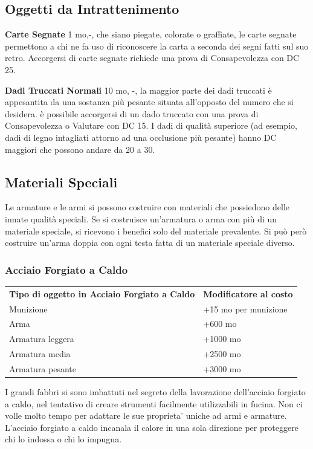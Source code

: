 \documentclass[a4paper,11pt,twoside,openany]{book}
\begin{document}
{\subsection{Oggetti da Intrattenimento}

\label{oggetti-da-intrattenimento}

\textbf{Carte Segnate} 1 mo,-, che siano piegate, colorate o graffiate, le carte segnate permettono a chi ne fa uso di riconoscere la carta a seconda dei segni fatti sul suo retro. Accorgersi di carte segnate richiede una prova di Consapevolezza con DC 25.

\textbf{Dadi Truccati Normali} 10 mo, -, la maggior parte dei dadi truccati è appesantita da una sostanza più pesante situata all'opposto del numero che si desidera. è possibile accorgersi di un dado truccato con una prova di Consapevolezza o Valutare con DC 15. I dadi di qualità superiore (ad esempio, dadi di legno intagliati attorno ad una occlusione più pesante) hanno DC maggiori che possono andare da 20 a 30.

\pagebreak

\subsection{Materiali Speciali}

Le armature e le armi si possono costruire con materiali che possiedono delle innate qualità speciali. Se si costruisce un'armatura o arma con più di un materiale speciale, si ricevono i benefici solo del materiale prevalente. Si può però costruire un'arma doppia con ogni testa fatta di un materiale speciale diverso.

\subsubsection{Acciaio Forgiato a Caldo}

\label{acciaio-forgiato-a-caldo}

\begin{tabular}{ll}
\toprule
\textbf{Tipo di oggetto in Acciaio Forgiato a Caldo} & \textbf{Modificatore al costo}\tabularnewline
Munizione & +15 mo per munizione\tabularnewline
Arma & +600 mo\tabularnewline
Armatura leggera & +1000 mo\tabularnewline
Armatura media & +2500 mo\tabularnewline
Armatura pesante & +3000 mo\tabularnewline
\end{tabular}

I grandi fabbri si sono imbattuti nel segreto della lavorazione dell'acciaio
forgiato a caldo, nel tentativo di creare strumenti facilmente utilizzabili
in fucina. Non ci volle molto tempo per adattare le sue proprieta'
uniche ad armi e armature. L'acciaio forgiato a caldo incanala il
calore in una sola direzione per proteggere chi lo indossa o chi lo
impugna.

}
\end{document}
